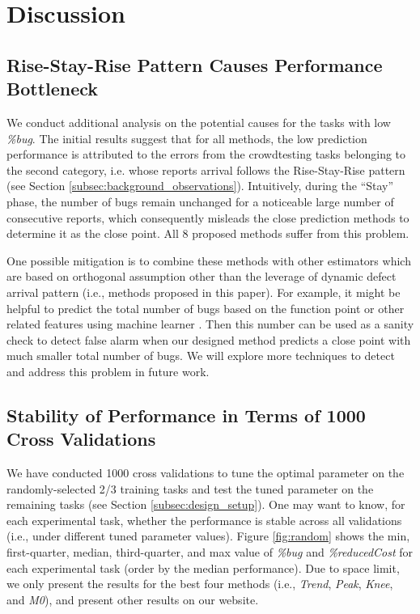 \documentclass[sigconf,review, anonymous]{acmart}
\begin{document}
\section{Discussion}
\label{sec:discussion}

\subsection{Rise-Stay-Rise Pattern Causes Performance Bottleneck}
\label{subsec:dis_badcase}

We conduct additional analysis on the potential causes for the tasks with low \textit{\%bug}.
The initial results suggest that for all methods, the low prediction performance is attributed to the errors from the crowdtesting tasks belonging to the second category, i.e. whose reports arrival follows the Rise-Stay-Rise pattern (see Section \ref{subsec:background_observations}). Intuitively, during the ``Stay'' phase, the number of bugs remain unchanged for a noticeable large number of consecutive reports, which consequently misleads the close prediction methods to determine it as the close point. All 8 proposed methods suffer from this problem.

One possible mitigation is to combine these methods with other estimators which are based on orthogonal assumption other than the leverage of dynamic defect arrival pattern (i.e., methods proposed in this paper). 
For example, it might be helpful to predict the total number of bugs based on the function point or other related features using machine learner \cite{fu2017easy,nam2017heterogeneous,menzies2007data}. Then this number can be used as a sanity check to detect false alarm when our designed method predicts a close point with much smaller total number of bugs. 
We will explore more techniques to detect and address this problem in future work.



\subsection{Stability of Performance in Terms of 1000 Cross Validations}
\label{subsec:dis_stability}

We have conducted 1000 cross validations to tune the optimal parameter on the randomly-selected 2/3 training tasks and test the tuned parameter on the remaining tasks (see Section \ref{subsec:design_setup}).
One may want to know, for each experimental task, whether the performance is stable across all validations (i.e., under different tuned parameter values).
Figure \ref{fig:random} shows the min, first-quarter, median, third-quarter, and max value of \textit{\%bug} and \textit{\%reducedCost} for each experimental task (order by the median performance).
Due to space limit, we only present the results for the best four methods (i.e., \textit{Trend}, \textit{Peak}, \textit{Knee}, and \textit{M0}), and present other results on our website.
\end{document}
